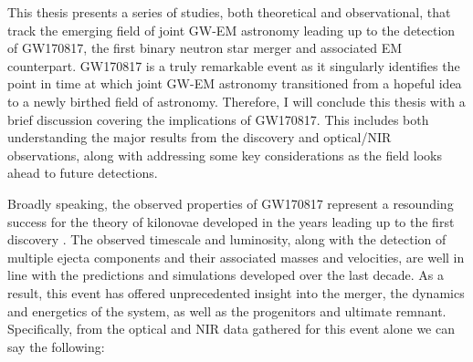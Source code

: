 This thesis presents a series of studies, both theoretical and observational, that track the emerging field of joint GW-EM astronomy leading up to the detection of GW170817, the first binary neutron star merger and associated EM counterpart. GW170817 is a truly remarkable event as it singularly identifies the point in time at which joint GW-EM astronomy transitioned from a hopeful idea to a newly birthed field of astronomy. Therefore, I will conclude this thesis with a brief discussion covering the implications of GW170817. This includes both understanding the major results from the discovery and optical/NIR observations, along with addressing some key considerations as the field looks ahead to future detections.

Broadly speaking, the observed properties of GW170817 represent a resounding success for the theory of kilonovae developed in the years leading up to the first discovery \citep{LP98,Rosswog+99,Metzger+10,BarnesKasen13,FernandezMetzger13,TanakaHotokezaka13,Barnes+16,Sekiguchi+16}. The observed timescale and luminosity, along with the detection of multiple ejecta components and their associated masses and velocities, are well in line with the predictions and simulations developed over the last decade. As a result, this event has offered unprecedented insight into the merger, the dynamics and energetics of the system, as well as the progenitors and ultimate remnant. Specifically, from the optical and NIR data gathered for this event alone we can say the following:
